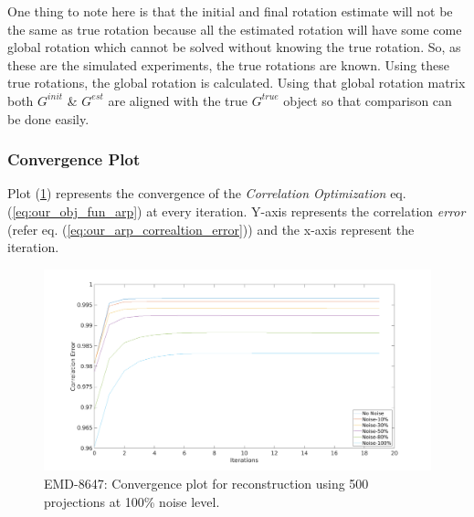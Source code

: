\documentclass[twoside]{iitbreport}
\begin{document}
One thing to note here is that the initial and final rotation estimate will not be the same as true rotation because all the estimated rotation will have some come global rotation which cannot be solved without knowing the true rotation. So, as these are the simulated experiments, the true rotations are known. Using these true rotations, the global rotation is calculated. Using that global rotation matrix both  $G^{init}$ \&  $G^{est}$ are aligned with the true  $G^{true}$ object so that comparison can be done easily.

\subsubsection{\textbf{Convergence Plot}}
Plot (\ref{figplot:emd_8647_result_Bm3d_convergence}) represents the convergence of the \textit{Correlation Optimization} eq. (\ref{eq:our_obj_fun_arp}) at every iteration. Y-axis represents the correlation \textit{error} (refer eq. (\ref{eq:our_arp_correaltion_error})) and the x-axis represent the iteration.

\begin{figure}[H]
\includegraphics[width=1\textwidth]{emd_8647_result_Bm3d_convergence.png}
\centering
\captionsetup{justification=centering}
\caption{EMD-8647: Convergence plot for reconstruction using 500 projections at 100\% noise level. }
\label{figplot:emd_8647_result_Bm3d_convergence}
\end{figure}
\end{document}
